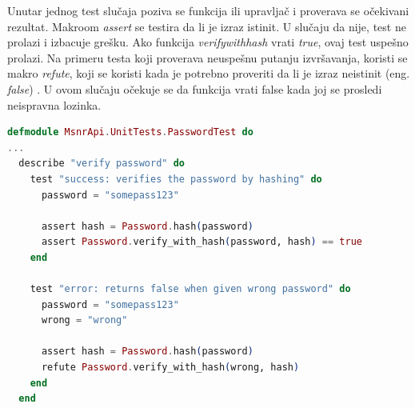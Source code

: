 \documentclass[12pt,oneside]{memoir}
\begin{document}
\par Unutar jednog test slučaja poziva se funkcija ili upravljač i proverava se očekivani rezultat. Makroom \emph{assert} se testira da li je izraz istinit. U slučaju da nije, test ne prolazi i izbacuje grešku. Ako funkcija \emph{verify{\textunderscore}with{\textunderscore}hash} vrati \emph{true}, ovaj test uspešno prolazi. Na primeru testa koji proverava neuspešnu putanju izvršavanja, koristi se makro \emph{refute}, koji se koristi kada je potrebno proveriti da li je izraz neistinit (eng. \emph{false}) . U ovom slučaju očekuje se da funkcija vrati false kada joj se prosledi neispravna lozinka.



\begin{lstlisting}[language=elixir, caption={Opisivanje testova unutar jedne grupe, na primeru funkcije za verifikaciju lozinke},captionpos=b, label={lst:desc}]
defmodule MsnrApi.UnitTests.PasswordTest do
...
  describe "verify password" do
    test "success: verifies the password by hashing" do
      password = "somepass123"

      assert hash = Password.hash(password)
      assert Password.verify_with_hash(password, hash) == true
    end

    test "error: returns false when given wrong password" do
      password = "somepass123"
      wrong = "wrong"

      assert hash = Password.hash(password)
      refute Password.verify_with_hash(wrong, hash)
    end
  end
\end{lstlisting}
\end{document}
